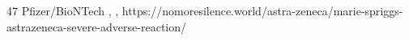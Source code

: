           {}
          {47}
          {Pfizer/BioNTech}
          {}
          {
            ,
            ,
          }
          {https://nomoresilence.world/astra-zeneca/marie-spriggs-astrazeneca-severe-adverse-reaction/}


